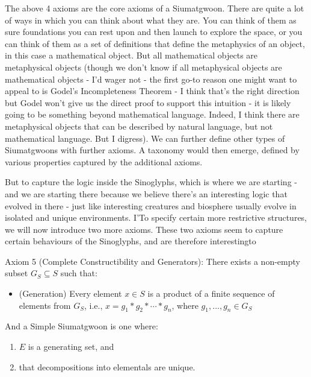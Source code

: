 The above 4 axioms are the core axioms of a Siumatgwoon. There are quite a lot of ways in which you can think about what they are. You can think of them as sure foundations you can rest upon and then launch to explore the space, or you can think of them as a set of definitions that define the metaphysics of an object, in this case a mathematical object. But all mathematical objects are metaphysical objects (though we don't know if all metaphysical objects are mathematical objects - I'd wager not - the first go-to reason one might want to appeal to is Godel's Incompleteness Theorem - I think that's the right direction but Godel won't give us the direct proof to support this intuition - it is likely going to be something beyond mathematical language. Indeed, I think there are metaphysical objects that can be described by natural language, but not mathematical language. But I digress). We can further define other types of Siumatgwoons with further axioms. A taxonomy would then emerge, defined by various properties captured by the additional axioms.

But to capture the logic inside the Sinoglyphs, which is where we are starting - and we are starting there because we believe there's an interesting logic that evolved in there - just like interesting creatures and biosphere usually evolve in isolated and unique environments. I'To specify certain more restrictive structures, we will now introduce two more axioms. 
These two axioms seem to capture certain behaviours of the Sinoglyphs, and are therefore interestingto 

\begin{axiom}\label{ax:construct}
Axiom 5 (Complete Constructibility and Generators): There exists a non-empty subset $G_{S} \subseteq S$ such that:
\begin{itemize}
\item (Generation) Every element $x \in S$ is a product of a finite sequence of elements from $G_S$, i.e., $x = g_1 * g_2 * \cdots * g_n$, where $g_1, \dots, g_n \in G_S$
\end{itemize}

And a Simple Siumatgwoon is one where:

\begin{enumerate}
\item $E$ is a generating set, and 
\item that decompositions into elementals are unique.
\end{enumerate}
\end{axiom}

